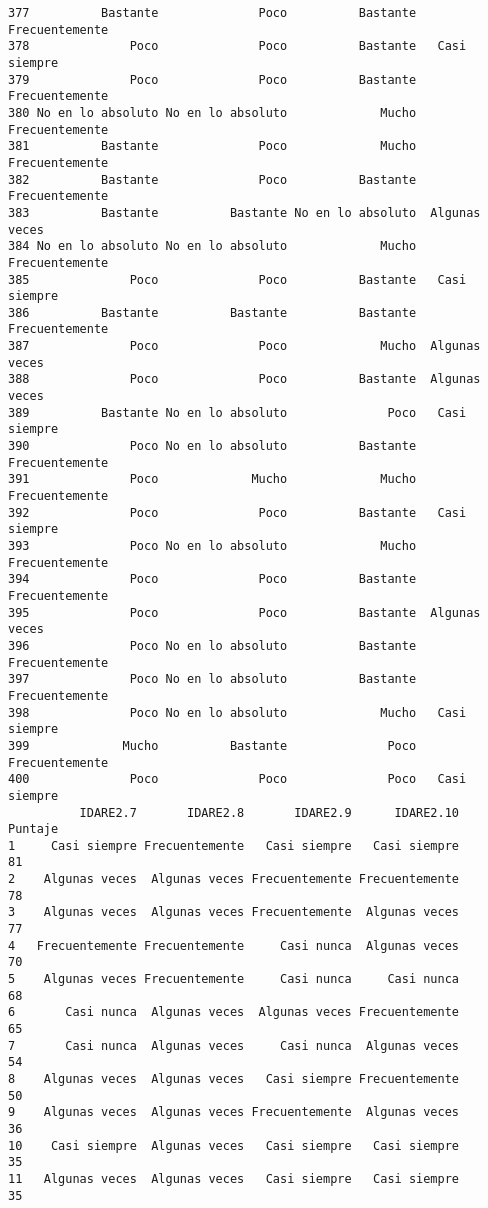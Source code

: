 \documentclass[
  letterpaper,
  DIV=11,
  numbers=noendperiod]{scrartcl}
\begin{document}
\begin{verbatim}
377          Bastante              Poco          Bastante Frecuentemente
378              Poco              Poco          Bastante   Casi siempre
379              Poco              Poco          Bastante Frecuentemente
380 No en lo absoluto No en lo absoluto             Mucho Frecuentemente
381          Bastante              Poco             Mucho Frecuentemente
382          Bastante              Poco          Bastante Frecuentemente
383          Bastante          Bastante No en lo absoluto  Algunas veces
384 No en lo absoluto No en lo absoluto             Mucho Frecuentemente
385              Poco              Poco          Bastante   Casi siempre
386          Bastante          Bastante          Bastante Frecuentemente
387              Poco              Poco             Mucho  Algunas veces
388              Poco              Poco          Bastante  Algunas veces
389          Bastante No en lo absoluto              Poco   Casi siempre
390              Poco No en lo absoluto          Bastante Frecuentemente
391              Poco             Mucho             Mucho Frecuentemente
392              Poco              Poco          Bastante   Casi siempre
393              Poco No en lo absoluto             Mucho Frecuentemente
394              Poco              Poco          Bastante Frecuentemente
395              Poco              Poco          Bastante  Algunas veces
396              Poco No en lo absoluto          Bastante Frecuentemente
397              Poco No en lo absoluto          Bastante Frecuentemente
398              Poco No en lo absoluto             Mucho   Casi siempre
399             Mucho          Bastante              Poco Frecuentemente
400              Poco              Poco              Poco   Casi siempre
          IDARE2.7       IDARE2.8       IDARE2.9      IDARE2.10 Puntaje
1     Casi siempre Frecuentemente   Casi siempre   Casi siempre      81
2    Algunas veces  Algunas veces Frecuentemente Frecuentemente      78
3    Algunas veces  Algunas veces Frecuentemente  Algunas veces      77
4   Frecuentemente Frecuentemente     Casi nunca  Algunas veces      70
5    Algunas veces Frecuentemente     Casi nunca     Casi nunca      68
6       Casi nunca  Algunas veces  Algunas veces Frecuentemente      65
7       Casi nunca  Algunas veces     Casi nunca  Algunas veces      54
8    Algunas veces  Algunas veces   Casi siempre Frecuentemente      50
9    Algunas veces  Algunas veces Frecuentemente  Algunas veces      36
10    Casi siempre  Algunas veces   Casi siempre   Casi siempre      35
11   Algunas veces  Algunas veces   Casi siempre   Casi siempre      35

\end{verbatim}
\end{document}

